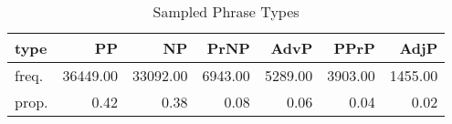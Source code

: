 \begin{table}[htbp!]
\centering
\caption{Sampled Phrase Types}
\label{table:type_counts}
\begin{tabular}{lrrrrrr}
\toprule
type &        PP &        NP &     PrNP &     AdvP &     PPrP &     AdjP \\
\midrule
freq. &  36449.00 &  33092.00 &  6943.00 &  5289.00 &  3903.00 &  1455.00 \\
prop. &      0.42 &      0.38 &     0.08 &     0.06 &     0.04 &     0.02 \\
\bottomrule
\end{tabular}
\end{table}
